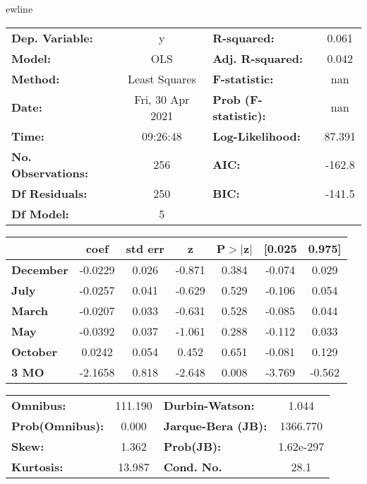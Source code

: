 ewline\begin{center}
\begin{tabular}{lclc}
\toprule
\textbf{Dep. Variable:}    &        y         & \textbf{  R-squared:         } &     0.061   \\
\textbf{Model:}            &       OLS        & \textbf{  Adj. R-squared:    } &     0.042   \\
\textbf{Method:}           &  Least Squares   & \textbf{  F-statistic:       } &       nan   \\
\textbf{Date:}             & Fri, 30 Apr 2021 & \textbf{  Prob (F-statistic):} &      nan    \\
\textbf{Time:}             &     09:26:48     & \textbf{  Log-Likelihood:    } &    87.391   \\
\textbf{No. Observations:} &         256      & \textbf{  AIC:               } &    -162.8   \\
\textbf{Df Residuals:}     &         250      & \textbf{  BIC:               } &    -141.5   \\
\textbf{Df Model:}         &           5      & \textbf{                     } &             \\
\bottomrule
\end{tabular}
\begin{tabular}{lcccccc}
                  & \textbf{coef} & \textbf{std err} & \textbf{z} & \textbf{P$> |$z$|$} & \textbf{[0.025} & \textbf{0.975]}  \\
\midrule
\textbf{December} &      -0.0229  &        0.026     &    -0.871  &         0.384        &       -0.074    &        0.029     \\
\textbf{July}     &      -0.0257  &        0.041     &    -0.629  &         0.529        &       -0.106    &        0.054     \\
\textbf{March}    &      -0.0207  &        0.033     &    -0.631  &         0.528        &       -0.085    &        0.044     \\
\textbf{May}      &      -0.0392  &        0.037     &    -1.061  &         0.288        &       -0.112    &        0.033     \\
\textbf{October}  &       0.0242  &        0.054     &     0.452  &         0.651        &       -0.081    &        0.129     \\
\textbf{3 MO}     &      -2.1658  &        0.818     &    -2.648  &         0.008        &       -3.769    &       -0.562     \\
\bottomrule
\end{tabular}
\begin{tabular}{lclc}
\textbf{Omnibus:}       & 111.190 & \textbf{  Durbin-Watson:     } &     1.044  \\
\textbf{Prob(Omnibus):} &   0.000 & \textbf{  Jarque-Bera (JB):  } &  1366.770  \\
\textbf{Skew:}          &   1.362 & \textbf{  Prob(JB):          } & 1.62e-297  \\
\textbf{Kurtosis:}      &  13.987 & \textbf{  Cond. No.          } &      28.1  \\
\bottomrule
\end{tabular}
\end{center}

